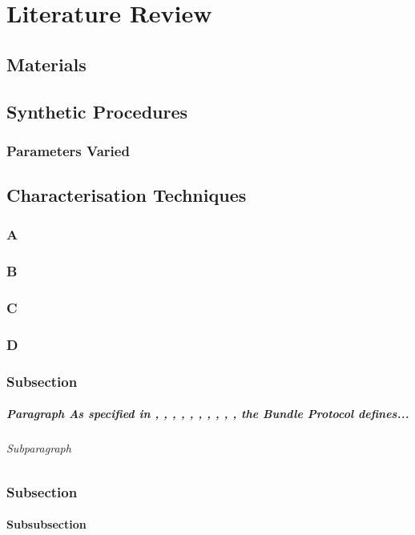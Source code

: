 \chapter{Literature Review}
\section{Materials}

\section{Synthetic Procedures}
\subsection{Parameters Varied}

\section{Characterisation Techniques}
\subsection{A}
\subsection{B}
\subsection{C}
\subsection{D}

\subsection{Subsection}
\paragraph{Paragraph
As specified in 
\cite{rfc9171}, 
\cite{rfc4838}, 
\cite{rfc5598}, 
\cite{rfc6238}, 
\cite{rfc6749}, 
\cite{rfc7208}, 
\cite{rfc6376}, 
\cite{fall2003delay}, 
\cite{jain2004routing}, 
\cite{rfc5321}, 
the Bundle Protocol defines...}
\subparagraph{Subparagraph}

\subsection{Subsection}

\subsubsection{Subsubsection}